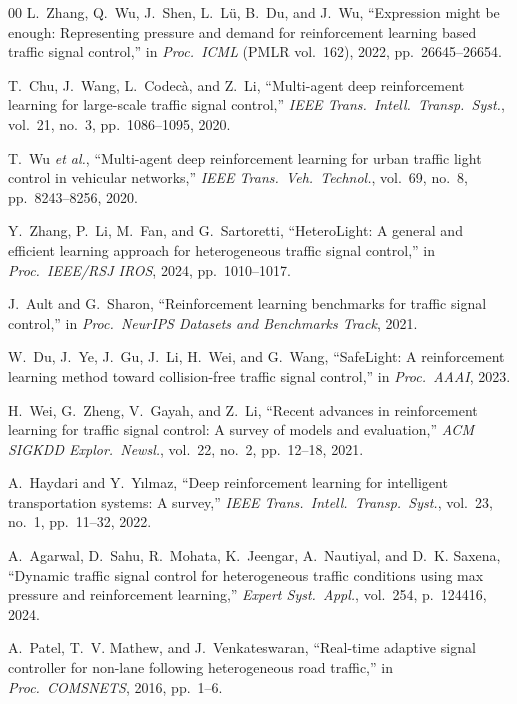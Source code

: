\documentclass[journal]{IEEEtran}
\begin{document}
\begin{thebibliography}{00}
L.~Zhang, Q.~Wu, J.~Shen, L.~L\"u, B.~Du, and J.~Wu, ``Expression might
be enough: Representing pressure and demand for reinforcement learning
based traffic signal control,'' in \textit{Proc.\ ICML} (PMLR vol.~162),
2022, pp.~26645--26654.

T.~Chu, J.~Wang, L.~Codec\`a, and Z.~Li, ``Multi-agent deep
reinforcement learning for large-scale traffic signal control,''
\textit{IEEE Trans.\ Intell.\ Transp.\ Syst.}, vol.~21, no.~3,
pp.~1086--1095, 2020.

T.~Wu \textit{et al.}, ``Multi-agent deep reinforcement learning for
urban traffic light control in vehicular networks,'' \textit{IEEE
Trans.\ Veh.\ Technol.}, vol.~69, no.~8, pp.~8243--8256, 2020.

Y.~Zhang, P.~Li, M.~Fan, and G.~Sartoretti, ``HeteroLight: A general and
efficient learning approach for heterogeneous traffic signal control,''
in \textit{Proc.\ IEEE/RSJ IROS}, 2024, pp.~1010--1017.

J.~Ault and G.~Sharon, ``Reinforcement learning benchmarks for traffic
signal control,'' in \textit{Proc.\ NeurIPS Datasets and Benchmarks
Track}, 2021.

W.~Du, J.~Ye, J.~Gu, J.~Li, H.~Wei, and G.~Wang, ``SafeLight: A
reinforcement learning method toward collision-free traffic signal
control,'' in \textit{Proc.\ AAAI}, 2023.

H.~Wei, G.~Zheng, V.~Gayah, and Z.~Li, ``Recent advances in
reinforcement learning for traffic signal control: A survey of models
and evaluation,'' \textit{ACM SIGKDD Explor.\ Newsl.}, vol.~22, no.~2,
pp.~12--18, 2021.

A.~Haydari and Y.~Y{\i}lmaz, ``Deep reinforcement learning for
intelligent transportation systems: A survey,'' \textit{IEEE Trans.\
Intell.\ Transp.\ Syst.}, vol.~23, no.~1, pp.~11--32, 2022.

A.~Agarwal, D.~Sahu, R.~Mohata, K.~Jeengar, A.~Nautiyal, and D.~K.
Saxena, ``Dynamic traffic signal control for heterogeneous traffic
conditions using max pressure and reinforcement learning,''
\textit{Expert Syst.\ Appl.}, vol.~254, p.~124416, 2024.

A.~Patel, T.~V. Mathew, and J.~Venkateswaran, ``Real-time adaptive
signal controller for non-lane following heterogeneous road traffic,''
in \textit{Proc.\ COMSNETS}, 2016, pp.~1--6.


\end{thebibliography}
\end{document}
